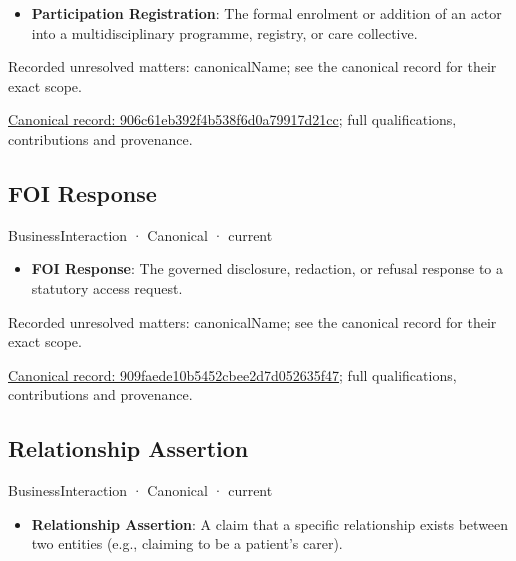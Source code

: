 \begin{itemize}


\item \textbf{Participation Registration}: The formal enrolment or addition of an actor into a multidisciplinary programme, registry, or care collective.

\end{itemize}

{\small Recorded unresolved matters: canonicalName; see the canonical record for their exact scope.}\par
{\footnotesize \href{../../../../continuum/business/business-interaction/906c61eb392f4b538f6d0a79917d21cc.md}{Canonical record: 906c61eb392f4b538f6d0a79917d21cc}; full qualifications, contributions and provenance.}\par
\subsection{FOI Response}

\label{element:909faede10b5452cbee2d7d052635f47}
{\small BusinessInteraction · Canonical · current}\par

\begin{itemize}


\item \textbf{FOI Response}: The governed disclosure, redaction, or refusal response to a statutory access request.

\end{itemize}

{\small Recorded unresolved matters: canonicalName; see the canonical record for their exact scope.}\par
{\footnotesize \href{../../../../continuum/business/business-interaction/909faede10b5452cbee2d7d052635f47.md}{Canonical record: 909faede10b5452cbee2d7d052635f47}; full qualifications, contributions and provenance.}\par
\subsection{Relationship Assertion}

\label{element:9a53f10eac7748a2b4a9d88da75f8814}
{\small BusinessInteraction · Canonical · current}\par

\begin{itemize}


\item \textbf{Relationship Assertion}: A claim that a specific relationship exists between two entities (e.g., claiming to be a patient's carer).

\end{itemize}

